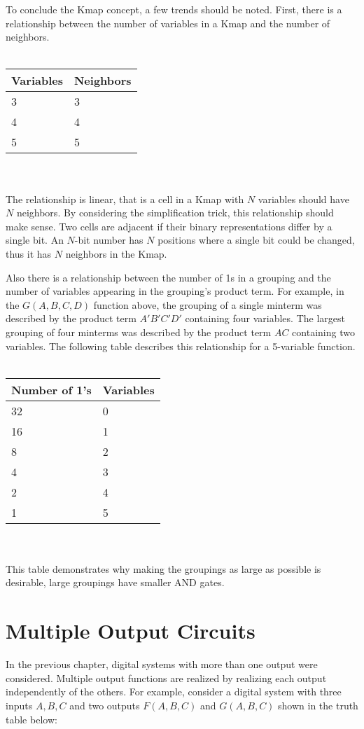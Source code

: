 To conclude the Kmap concept, a few trends 
should be noted.  First, there is a relationship between the
number of variables in a Kmap and the number of neighbors.
\\ \\
\begin{tabular}{l|l}
Variables & Neighbors	\\ \hline
3	  &  3		\\ \hline
4	  &  4		\\ \hline
5	  &  5		\\ 
\end{tabular}
\\ \\
The relationship is linear, that is a cell in a Kmap with 
$N$ variables should have $N$ neighbors.   By considering
the simplification trick, this relationship should make sense. Two cells
are adjacent if their binary representations differ by a single
bit.  An $N$-bit number has $N$ positions where a single bit
could be changed, thus it has $N$ neighbors in the Kmap.  

Also there is a relationship between the number of 1s in a 
grouping and the number of variables appearing in the grouping's
product term.  For example, in the $G(A,B,C,D)$ function
above, the grouping of a single minterm was described by the
product term $A'B'C'D'$ containing four variables.  The largest
grouping of four  minterms was described by the product term
$AC$ containing two variables.  The following table describes 
this relationship for a 5-variable function.
\\ \\
\begin{tabular}{l|l}
Number of 1's	& Variables  \\ \hline
32		&	0	\\ \hline
16		&	1	\\ \hline
8		&	2	\\ \hline
4		&	3	\\ \hline
2		&	4	\\ \hline
1		&	5	\\ 
\end{tabular}
\\ \\
This table demonstrates why making the groupings as large
as possible is desirable, large groupings have smaller AND gates.

\section{Multiple Output Circuits}
In the previous chapter, digital systems with more than one output 
were considered.  Multiple output functions are realized by
realizing each output independently of the others. For example, 
consider a digital system with three inputs $A,B,C$ and two outputs 
$F(A,B,C)$ and $G(A,B,C)$ shown in the truth table below:

